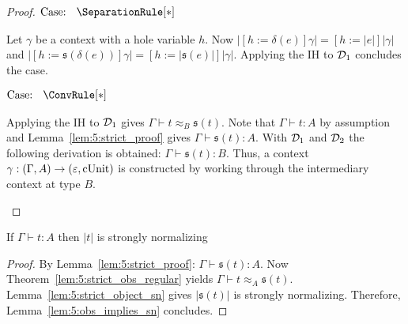 \begin{proof}
    $\text{Case: }\begin{array}{c} \SeparationRule[*] \end{array}$
    \begin{proofcase}
        Let $\gamma$ be a context with a hole variable $h$.
        Now $|[h := \delta(e)]\gamma| = [h := |e|]|\gamma|$ and $|[h := \mathfrak{s}(\delta(e))]\gamma| = [h := |\mathfrak{s}(e)|]|\gamma|$.
        Applying the IH to $\mathcal{D}_{1}$ concludes the case.
    \end{proofcase}

    $\text{Case: }\begin{array}{c} \ConvRule[*] \end{array}$
    \begin{proofcase}
        Applying the IH to $\mathcal{D}_{1}$ gives $\Gamma \vdash t \approx_B \mathfrak{s}(t)$.
        Note that $\Gamma \vdash t : A$ by assumption and Lemma~\ref{lem:5:strict_proof} gives $\Gamma \vdash \mathfrak{s}(t) : A$.
        With $\mathcal{D}_{1}$ and $\mathcal{D}_{2}$ the following derivation is obtained: $\Gamma \vdash \mathfrak{s}(t) : B$.
        Thus, a context $\gamma : (\Gamma, A) \to (\varepsilon, \textnormal{cUnit})$ is constructed by working through the intermediary context at type $B$.
    \end{proofcase}
\end{proof}

\begin{theorem}
    \label{lem:5:object_normalization}
    If $\Gamma \vdash t : A$ then $|t|$ is strongly normalizing
\end{theorem}
\begin{proof}
    By Lemma~\ref{lem:5:strict_proof}: $\Gamma \vdash \mathfrak{s}(t) : A$.
    Now Theorem~\ref{lem:5:strict_obs_regular} yields $\Gamma \vdash t \approx_A \mathfrak{s}(t)$.
    Lemma~\ref{lem:5:strict_object_sn} gives $|\mathfrak{s}(t)|$ is strongly normalizing.
    Therefore, Lemma~\ref{lem:5:obs_implies_sn} concludes.
\end{proof}